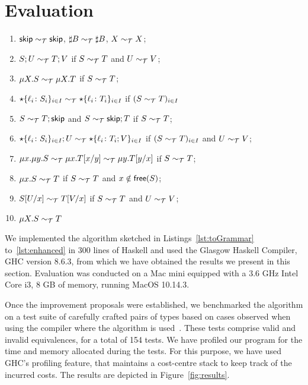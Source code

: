 \section{Evaluation}
\label{sec:evaluation}

\begin{theorem}
  \begin{enumerate}
  \item $\mathsf{skip} \sim_\mathcal T \mathsf{skip}$,  $\sharp B \sim_\mathcal T \sharp B$,
    $X \sim_\mathcal T X$;
  \item $S;U \sim_\mathcal T T;V$ if $S \sim_\mathcal T T$ and $U \sim_\mathcal T V$; 
  \item $\mu X.S \sim_\mathcal T \mu X.T$ if $S \sim_\mathcal T T$; 
  \item $\star\{\ell_i\colon S_i\}_{i\in I}\sim_\mathcal T
    \star\{\ell_i\colon T_i\}_{i\in I}$ if $(S \sim_\mathcal T T)_{i\in I}$
  \item $S\sim_\mathcal T T;\mathsf{skip}$ and $S\sim_\mathcal T \mathsf{skip};T$ if $S \sim_\mathcal T T$;
  \item $\star\{\ell_i\colon S_i\}_{i\in I};U\sim_\mathcal T
    \star\{\ell_i\colon T_i;V\}_{i\in I}$ if $(S \sim_\mathcal T T)_{i\in
      I}$ and $U \sim_\mathcal T V$; 
  \item
    $\mu x.\mu y.S \sim_\mathcal T \mu x.T[{x}/{y}] \sim_\mathcal T \mu y.T[{y}/{x}]$ if $S \sim_\mathcal T T$;
  \item $\mu x.S \sim_\mathcal T T$ if $S \sim_\mathcal T T$ and $x\notin\mathsf{free}(S)$;
  \item $S[{U}/{x}]\sim_\mathcal T T[{V}/{x}]$  if $S \sim_\mathcal T T$ and $U \sim_\mathcal T V$; 
  \item $\mu X.S \sim_\mathcal T T$
  \end{enumerate}
\end{theorem}

We implemented the algorithm sketched in Listings~\ref{lst:toGrammar}
to~\ref{lst:enhanced} in 300 lines of Haskell and used the Glasgow
Haskell Compiler, GHC version 8.6.3, from which we have obtained the
results we present in this section.  Evaluation was conducted on a Mac
mini equipped with a 3.6 GHz Intel Core i3, 8 GB of memory, running
MacOS 10.14.3.

Once the improvement proposals were established, we benchmarked the
algorithm on a test suite of carefully crafted pairs of types
based on cases observed when using the compiler where the algorithm is 
used~\cite{almeida.etal_freest-functional-language}. These
tests comprise valid and invalid equivalences, for a total of 154
tests. We have profiled our program for the time and memory allocated
during the tests. For this purpose, we have used GHC's profiling
feature, that maintains a cost-centre stack to keep track of the
incurred costs. The results are depicted in
Figure~\ref{fig:results}.

